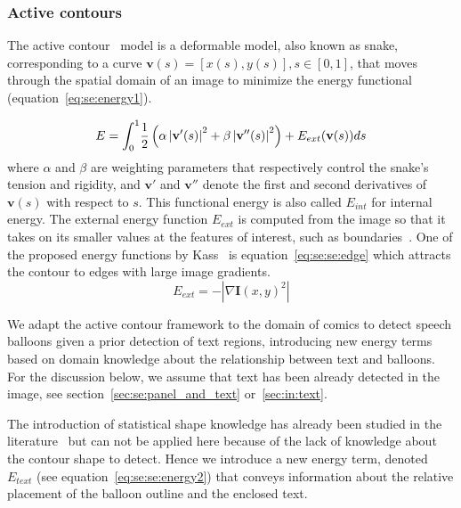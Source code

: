 \subsubsection{Active contours}
\label{sec:se:active_contour}

The active contour~\cite{Kass1988} model is a deformable model, also known as snake, corresponding to a curve $\mathbf{v}(s)=[x(s),y(s)], s \in [0,1]$, that moves through the spatial domain of an image to minimize the energy functional (equation~\ref{eq:se:energy1}).

\begin{equation}\label{eq:se:energy1}
  E = \int_0^1 \! \frac{1}{2} \left( \alpha \left|\mathbf{v}'(s) \right|^2 + \beta \left| \mathbf{v}''(s) \right|^2 \right) + E_{ext}(\mathbf{v}(s))ds\\
\end{equation}
where $\alpha$ and $\beta$ are weighting parameters that respectively control the snake's tension and rigidity, and $\mathbf{v}'$ and $\mathbf{v}''$ denote the first and second derivatives of $\mathbf{v}(s)$ with respect to $s$. This functional energy is also called $E_{int}$ for internal energy.
The external energy function $E_{ext}$ is computed from the image so that it takes on its smaller values at the features of interest, such as boundaries~\cite{Xu1998}.
One of the proposed energy functions by Kass~\cite{Kass1988} is equation~\ref{eq:se:se:edge} which attracts the contour to edges with large image gradients. 
\begin{equation}\label{eq:se:se:edge}
  E_{ext} = -|\nabla \mathbf{I}(x,y)^2|
\end{equation}

We adapt the active contour framework to the domain of comics to detect speech balloons given a prior detection of text regions, introducing new energy terms based on domain knowledge about the relationship between text and balloons.
For the discussion below, we assume that text has been already detected in the image, see section~\ref{sec:se:panel_and_text} or~\ref{sec:in:text}.%

The introduction of statistical shape knowledge has already been studied in the literature~\cite{Cremers2002} but can not be applied here because of the lack of knowledge about the contour shape to detect.
Hence we introduce a new energy term, denoted $E_{text}$ (see equation~\ref{eq:se:se:energy2}) that conveys information about the relative placement of the balloon outline and the enclosed text.

